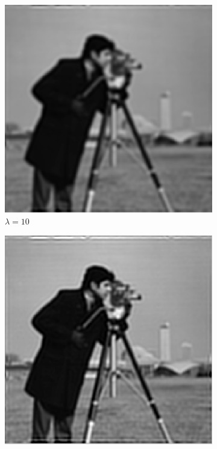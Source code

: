\documentclass[a4paper, 10pt, conference] {article}
\begin{document}
\begin{figure}[H]
	\centering
	\begin{subfigure}{0.49\textwidth} 
		\centering						
		\includegraphics[scale=0.48]{gaussian/no_noise/lam10.PNG}
		\caption{$\lambda = 10$}
	\end{subfigure}
	\begin{subfigure}{0.49\textwidth} 
		\centering						
		\includegraphics[scale=0.48]{gaussian/no_noise/lam100.PNG}

\end{subfigure}
\end{figure}
\end{document}
